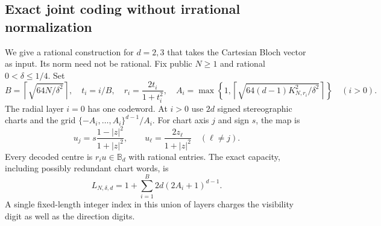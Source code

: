 \subsection{Exact joint coding without irrational normalization}
We give a rational construction for $d=2,3$ that takes the Cartesian
Bloch vector as input. Its norm need not be rational. Fix public
$N\ge1$ and rational $0<\delta\le1/4$. Set
\begin{equation}\label{eq:jointgrids74}
 B=\left\lceil\sqrt{64N/\delta^2}\right\rceil,\quad
 t_i=i/B,\quad r_i=\frac{2t_i}{1+t_i^2},\quad
 A_i=\max\left\{1,\left\lceil\sqrt{64(d-1)K_{N,r_i}^2/\delta^2}
                                      \right\rceil\right\}\quad(i>0).
\end{equation}
The radial layer $i=0$ has one codeword. At $i>0$ use $2d$ signed
stereographic charts and the grid $\{-A_i,\ldots,A_i\}^{d-1}/A_i$.
For chart axis $j$ and sign $s$, the map is
\begin{equation}\label{eq:spherechart74}
 u_j=s\frac{1-|z|^2}{1+|z|^2},\qquad
 u_\ell=\frac{2z_\ell}{1+|z|^2}\quad(\ell\ne j).
\end{equation}
Every decoded centre is $r_i u\in\mathbb B_d$ with rational entries.
The exact capacity, including possibly redundant chart words, is
\begin{equation}\label{eq:jointcapacity74}
 L_{N,\delta,d}=1+\sum_{i=1}^{B}2d(2A_i+1)^{d-1}.
\end{equation}
A single fixed-length integer index in this union of layers charges
the visibility digit as well as the direction digits.

